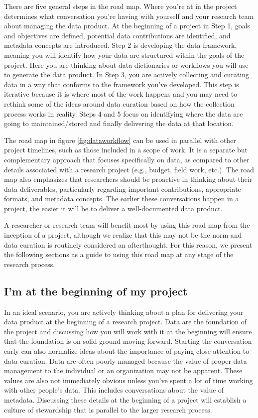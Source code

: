 \documentclass[
]{book}
\begin{document}
There are five general steps in the road map. Where you're at in the project determines what conversation you're having with yourself and your research team about managing the data product. At the beginning of a project in Step 1, goals and objectives are defined, potential data contributions are identified, and metadata concepts are introduced. Step 2 is developing the data framework, meaning you will identify how your data are structured within the goals of the project. Here you are thinking about data dictionaries or workflows you will use to generate the data product. In Step 3, you are actively collecting and curating data in a way that conforms to the framework you've developed. This step is iterative because it is where most of the work happens and you may need to rethink some of the ideas around data curation based on how the collection process works in reality. Steps 4 and 5 focus on identifying where the data are going to maintained/stored and finally delivering the data at that location.

The road map in figure \ref{fig:dataworkflow} can be used in parallel with other project timelines, such as those included in a scope of work. It is a separate but complementary approach that focuses specifically on data, as compared to other details associated with a research project (e.g., budget, field work, etc.). The road map also emphasizes that researchers should be proactive in thinking about their data deliverables, particularly regarding important contributions, appropriate formats, and metadata concepts. The earlier these conversations happen in a project, the easier it will be to deliver a well-documented data product.

A researcher or research team will benefit most by using this road map from the inception of a project, although we realize that this may not be the norm and data curation is routinely considered an afterthought. For this reason, we present the following sections as a guide to using this road map at any stage of the research process.

\hypertarget{beginning}{%
\subsection{I'm at the beginning of my project}\label{beginning}}

In an ideal scenario, you are actively thinking about a plan for delivering your data product at the beginning of a research project. Data are the foundation of the project and discussing how you will work with it at the beginning will ensure that the foundation is on solid ground moving forward. Starting the conversation early can also normalize ideas about the importance of paying close attention to data curation. Data are often poorly managed because the value of proper data management to the individual or an organization may not be apparent. These values are also not immediately obvious unless you've spent a lot of time working with other people's data. This includes conversations about the value of metadata. Discussing these details at the beginning of a project will establish a culture of stewardship that is parallel to the larger research process.
\end{document}
